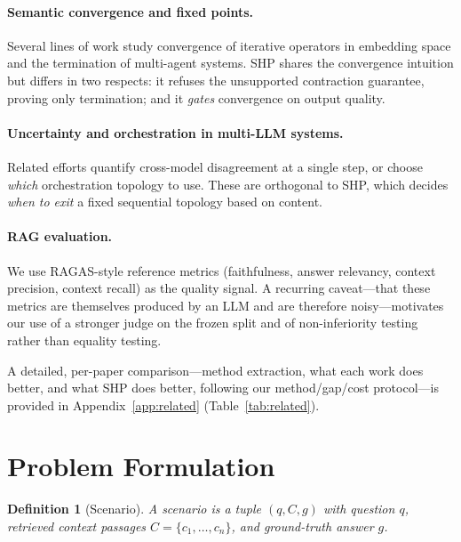 \documentclass[conference]{IEEEtran}
\newtheorem{definition}{Definition}
\begin{document}
\paragraph{Semantic convergence and fixed points.} Several lines of work study
convergence of iterative operators in embedding space and the termination of
multi-agent systems. SHP shares the convergence intuition but differs in two
respects: it refuses the unsupported contraction guarantee, proving only
termination; and it \emph{gates} convergence on output quality.

\paragraph{Uncertainty and orchestration in multi-LLM systems.} Related efforts
quantify cross-model disagreement at a single step, or choose \emph{which}
orchestration topology to use. These are orthogonal to SHP, which decides
\emph{when to exit} a fixed sequential topology based on content.

\paragraph{RAG evaluation.} We use RAGAS-style reference metrics (faithfulness,
answer relevancy, context precision, context recall) as the quality signal. A
recurring caveat---that these metrics are themselves produced by an LLM and are
therefore noisy---motivates our use of a stronger judge on the frozen split and of
non-inferiority testing rather than equality testing.

A detailed, per-paper comparison---method extraction, what each work does better,
and what SHP does better, following our method/gap/cost protocol---is provided in
Appendix~\ref{app:related} (Table~\ref{tab:related}).

\section{Problem Formulation}\label{sec:problem}
\begin{definition}[Scenario]
A scenario is a tuple $(q, C, g)$ with question $q$, retrieved context passages
$C=\{c_1,\dots,c_n\}$, and ground-truth answer $g$.
\end{definition}
\end{document}
